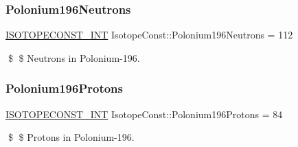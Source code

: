 \subsubsection{\texorpdfstring{Polonium196\+Neutrons}{Polonium196Neutrons}}
{\footnotesize\ttfamily \mbox{\hyperlink{group___isotope_const-_macros_ga5f18360b3e99483a35c32d789e62621c}{I\+S\+O\+T\+O\+P\+E\+C\+O\+N\+S\+T\+\_\+\+I\+NT}} Isotope\+Const\+::\+Polonium196\+Neutrons = 112}

\$ \$ Neutrons in Polonium-\/196. \mbox{\label{group___isotope_const-_polonium-_po196_gab8ded7c950ed659ab1724a0bc9c1484e}} 
\subsubsection{\texorpdfstring{Polonium196\+Protons}{Polonium196Protons}}
{\footnotesize\ttfamily \mbox{\hyperlink{group___isotope_const-_macros_ga5f18360b3e99483a35c32d789e62621c}{I\+S\+O\+T\+O\+P\+E\+C\+O\+N\+S\+T\+\_\+\+I\+NT}} Isotope\+Const\+::\+Polonium196\+Protons = 84}

\$ \$ Protons in Polonium-\/196. 